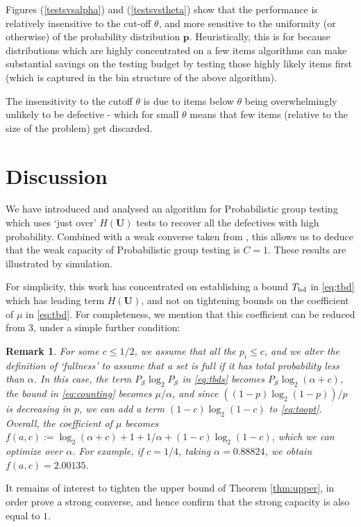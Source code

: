 \documentclass[conference]{IEEEtran}
\newtheorem{remark}[theorem]{Remark}
\newcommand{\vc}[1]{{\mathbf{ #1}}}
\newcommand{\setS}{{\mathcal{S}}}
\newcommand{\bd}{{\rm bd}}
\begin{document}
Figures (\ref{testsvsalpha}) and (\ref{testsvstheta}) show that the performance is relatively insensitive to the cut-off \(\theta\), and more sensitive to the uniformity (or otherwise) of the probability distribution \(\vc{p}\). Heuristically, this is for because distributions which are highly concentrated on a few items algorithms can make substantial savings on the testing budget by testing those highly likely items first (which is captured in the bin structure of the above algorithm). 

The insensitivity to the cutoff \(\theta\) is due to items below \(\theta\) being overwhelmingly unlikely to be defective - which for small \(\theta\) means that few items (relative to the size of the problem) get discarded.

\section{Discussion}
%
We have introduced and analysed an algorithm for Probabilistic group testing which uses `just over' $H(\vc{U})$ tests to
recover all the defectives with high probability. Combined with a weak converse taken from \cite{li5}, this allows us to deduce that
the weak capacity of Probabilistic group testing is $C=1$.  
These results are illustrated by simulation.

For simplicity, this work has concentrated on establishing a bound $T_{\bd}$ in \eqref{eq:tbd} which has leading term $H(\vc{U})$,
and not on tightening bounds on the coefficient of $\mu$ in \eqref{eq:tbd}. For completeness, we mention that this coefficient
can be reduced from 3, under a simple further condition:

\begin{remark}
For some $c \leq 1/2$, we assume that all the $p_i \leq c$, and we alter the definition of `fullness' to assume that a set is
full if it has total probability less than $\alpha$. In this case, the term $P_{\setS} \log_2 P_{\setS}$ in \eqref{eq:tbds}
becomes $P_{\setS} \log_2 (\alpha + c)$, the bound in \eqref{eq:counting} becomes $\mu/\alpha$, and since
$\left( (1-p) \log_2 (1-p) \right)/p$ is decreasing in $p$, we can add a term $(1-c) \log_2 (1-c) $ to \eqref{eq:toopt}.
Overall, the coefficient of $\mu$ becomes $f(a,c) := \log_2 (\alpha + c) + 1 + 1/\alpha + (1-c) \log_2(1-c)$, which we can optimize over
$\alpha$. For example, if $c = 1/4$, taking $\alpha = 0.88824$, we obtain $f(a,c) = 2.00135$.
\end{remark}

It remains of interest to tighten the upper bound of Theorem \ref{thm:upper},
in order prove a strong converse, and hence confirm that the strong capacity is also equal to $1$.
\end{document}

